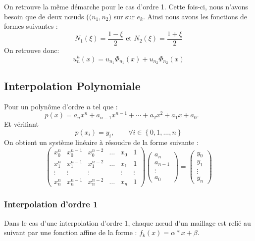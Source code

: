 \documentclass[a4paper,10pt]{report} %
\begin{document}
On retrouve la même démarche pour le cas d'ordre 1. Cette fois-ci, nous n'avons besoin que de deux nœuds ($(n_{1},n_{2}$) sur sur $e_{k}$.
Ainsi nous avons les fonctions de formes suivantes :
\begin{displaymath}
N_{1}(\xi)=\frac{1-\xi}{2} \mbox{  et  }  N_{2}(\xi)=\frac{1+\xi}{2}
\end{displaymath}
On retrouve donc:
\begin{displaymath}
u^{h}_n(x)=u_{n_{1}}\Phi_{n_{1}}(x)+u_{n_{2}}\Phi_{n_{2}}(x)\end{displaymath}

\subsection{Interpolation Polynomiale}

Pour un polynôme d'ordre $n$ tel que :
$$p(x) = a_n x^n + a_{n-1} x^{n-1} + \cdots + a_2 x^2 + a_1 x + a_0. \qquad$$ 
Et vérifiant $$p(x_i) = y_i,\qquad \forall i \in \left\{ 0, 1, \dots, n\right\}$$
On obtient un système linéaire à résoudre de la forme suivante :
\begin{equation}
\begin{pmatrix}
x_0^n & x_0^{n-1} & x_0^{n-2} & \ldots & x_0 & 1 \\
x_1^n & x_1^{n-1} & x_1^{n-2} & \ldots & x_1 & 1 \\
\vdots & \vdots & \vdots & & \vdots & \vdots \\
x_n^n & x_n^{n-1} & x_n^{n-2} & \ldots & x_n & 1 
\end{pmatrix}
\begin{pmatrix}
a_n \\
a_{n-1} \\
\vdots \\
a_0
\end{pmatrix}
=
\begin{pmatrix}
y_0 \\
y_1 \\
\vdots \\
y_n
\end{pmatrix}
\end{equation}

\subsubsection{Interpolation d'ordre 1}

Dans le cas d'une interpolation d'ordre 1, chaque nœud d'un maillage est relié au suivant par une fonction affine de la forme : $f_{k}(x)=\alpha*x+\beta$.
\end{document}
